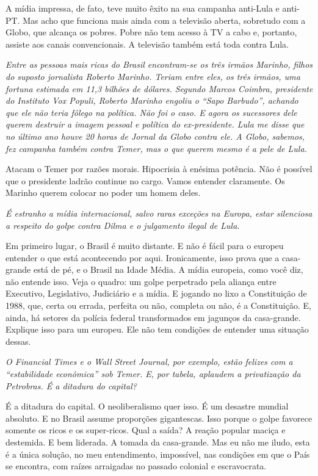 \normalfont 
A mídia impressa, de fato, teve muito êxito na sua
campanha anti-Lula e anti-PT. Mas acho que funciona mais ainda com a
televisão aberta, sobretudo com a Globo, que alcança os pobres. Pobre
não tem acesso à TV a cabo e, portanto, assiste aos canais
convencionais. A televisão também está toda contra Lula.

\itshape
 Entre as pessoas mais ricas do Brasil encontram-se os
três irmãos Marinho, filhos do suposto jornalista Roberto Marinho.
Teriam entre eles, os três irmãos, uma fortuna estimada em 11,3 bilhões
de dólares. Segundo Marcos Coimbra, presidente do Instituto Vox Populi,
Roberto Marinho engoliu o ``Sapo Barbudo'', achando que ele não teria
fôlego na política. Não foi o caso. E agora os sucessores dele querem
destruir a imagem pessoal e política do ex-presidente. Lula me disse que
no último ano houve 20 horas de Jornal da Globo contra ele. A Globo,
sabemos, fez campanha também contra Temer, mas o que querem mesmo é a
pele de Lula.

\normalfont 
Atacam o Temer por razões morais. Hipocrisia à enésima
potência. Não é possível que o presidente ladrão continue no cargo.
Vamos entender claramente. Os Marinho querem colocar no poder um homem
deles.

\itshape
 É estranho a mídia internacional, salvo raras exceções
na Europa, estar silenciosa a respeito do golpe contra Dilma e o
julgamento ilegal de Lula.

\normalfont 
Em primeiro lugar, o Brasil é muito distante. E não é
fácil para o europeu entender o que está acontecendo por aqui.
Ironicamente, isso prova que a casa-grande está de pé, e o Brasil na
Idade Média. A mídia europeia, como você diz, não entende isso. Veja o
quadro: um golpe perpetrado pela aliança entre Executivo, Legislativo,
Judiciário e a mídia. E jogando no lixo a Constituição de 1988, que,
certa ou errada, perfeita ou não, completa ou não, é a Constituição. E,
ainda, há setores da polícia federal transformados em jagunços da
casa-grande. Explique isso para um europeu. Ele não tem condições de
entender uma situação dessas.

\itshape
 O \emph{Financial Times} e o \emph{Wall Street
Journal}, por exemplo, estão felizes com a ``estabilidade econômica''
sob Temer. E, por tabela, aplaudem a privatização da Petrobras. É a
ditadura do capital?

\normalfont 
É a ditadura do capital. O neoliberalismo quer isso. É um
desastre mundial absoluto. E no Brasil assume proporções gigantescas.
Isso porque o golpe favorece somente os ricos e os super-ricos. Qual a
saída? A reação popular maciça e destemida. E bem liderada. A tomada da
casa-grande. Mas eu não me iludo, esta é a única solução, no meu
entendimento, impossível, nas condições em que o País se encontra, com
raízes arraigadas no passado colonial e escravocrata.

